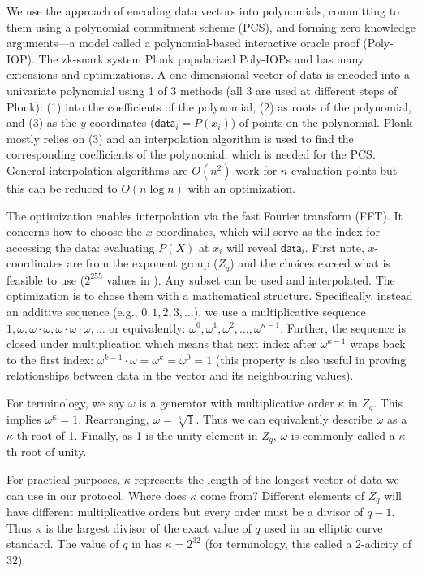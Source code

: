 We use the approach of encoding data vectors into polynomials, committing to them using a polynomial commitment scheme (PCS), and forming zero knowledge arguments---a model called a polynomial-based interactive oracle proof (Poly-IOP). The zk-snark system Plonk popularized Poly-IOPs and has many extensions and optimizations. A one-dimensional vector of data is encoded into a univariate polynomial using 1 of 3 methods (all 3 are used at different steps of Plonk): (1) into the coefficients of the polynomial, (2) as roots of the polynomial, and (3) as the \(y\)-coordinates (\(\mathsf{data}_i=P(x_i)\)) of points on the polynomial. Plonk mostly relies on (3) and an interpolation algorithm is used to find the corresponding coefficients of the polynomial, which is
needed for the PCS. General interpolation algorithms are \(O(n^2)\) work for \(n\) evaluation points but this can be reduced to \(O(n\log n)\) with an optimization.

The optimization enables interpolation via the fast Fourier transform (FFT). It concerns how to choose the \(x\)-coordinates, which will serve as the index for accessing the data: evaluating \(P(X)\) at \(x_i\) will reveal \(\mathsf{data}_i\). First note, \(x\)-coordinates are from the exponent group (\(Z_q\)) and the choices exceed what is feasible to use (\(2^{255}\) values in \bls). Any subset can be used and interpolated. The optimization is to chose them with a mathematical structure. Specifically, instead an additive sequence (e.g., \(0,1,2,3,\ldots\)), we use a multiplicative sequence
\(1,\omega,\omega\cdot\omega,\omega\cdot\omega\cdot\omega,\ldots\) or equivalently: \(\omega^0,\omega^1,\omega^2,\ldots,\omega^{\kappa-1}\). Further, the sequence is closed under multiplication which means that next index after \(\omega^{\kappa-1}\) wraps back to the first index: \(\omega^{k-1} \cdot \omega = \omega^\kappa = \omega^0=1\) (this property is also useful in proving relationships between data in the vector and its neighbouring values).

For terminology, we say \(\omega\) is a generator with multiplicative order \(\kappa\) in \(Z_q\). This implies \(\omega^\kappa=1\). Rearranging, \(\omega=\sqrt[\kappa]{1}\). Thus we can equivalently describe \(\omega\) as a \(\kappa\)-th root of 1. Finally, as 1 is the unity element in \(Z_q\), \(\omega\) is commonly called a \(\kappa\)-th root of unity.

For practical purposes, \(\kappa\) represents the length of the longest vector of data we can use in our protocol. Where does \(\kappa\) come from? Different elements of \(Z_q\) will have different multiplicative orders but every order must be a divisor of \(q-1\). Thus \(\kappa\) is the largest divisor of the exact value of \(q\) used in an elliptic curve standard. The value of $q$ in \bls has \(\kappa=2^{32}\) (for terminology, this called a \(2\)-adicity of \(32\)).



